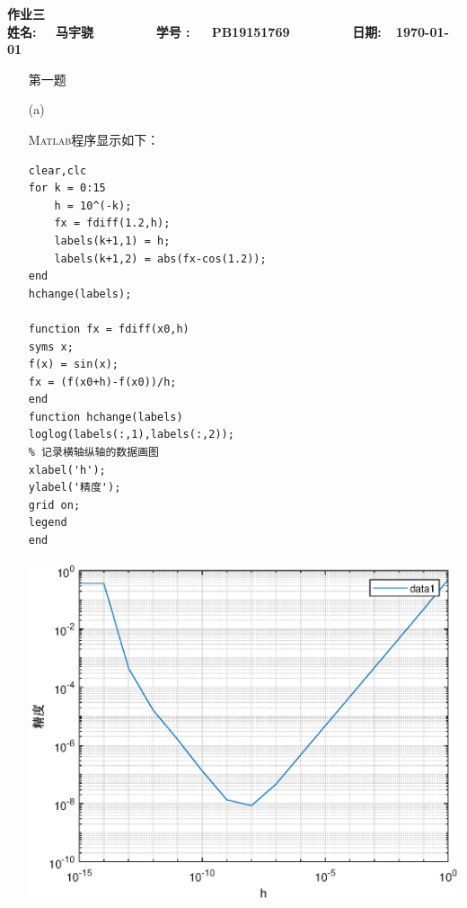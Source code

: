 \documentclass[12pt,a4paper,UTF8]{ctexart}
\begin{document}


\begin{center}
\textbf{作业三}\\
\textbf{姓名: ~~马宇骁~~~~~~~~ 学号 :~~~PB19151769~~~~~~~~ 日期:~~\today}\\
\end{center}

\begin{center}
\fbox{
\begin{minipage}{40em}
\vspace{5cm}
\hspace{20cm}
\end{minipage}}
\end{center}
\vspace{1cm}

\begin{enumerate}
\item[第一题] 

(a)

\textsc{Matlab}程序显示如下：
\begin{lstlisting}[frame=single]
clear,clc
for k = 0:15
    h = 10^(-k);
    fx = fdiff(1.2,h);
    labels(k+1,1) = h;
    labels(k+1,2) = abs(fx-cos(1.2));
end
hchange(labels);

function fx = fdiff(x0,h)
syms x;
f(x) = sin(x);
fx = (f(x0+h)-f(x0))/h;
end
function hchange(labels)
loglog(labels(:,1),labels(:,2));
% 记录横轴纵轴的数据画图
xlabel('h');
ylabel('精度');
grid on;
legend
end
\end{lstlisting}
\begin{center}
\includegraphics[scale=1]{1a.eps}
\end{center}


\end{enumerate}
\end{document}
